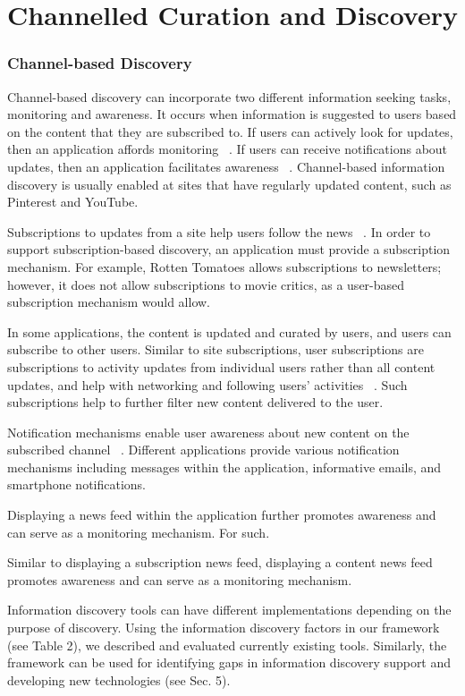 {\section{Channelled Curation and Discovery}

{\subsubsection{Channel-based Discovery}
Channel-based discovery can incorporate two different information seeking tasks, monitoring and awareness. It occurs when information is suggested to users based on the content that they are subscribed to. If users can actively look for updates, then an application affords monitoring ~\cite{morrison}. If users can receive notifications about updates, then an application facilitates awareness ~\cite{bates2002, bates1986}. Channel-based information discovery is usually enabled at sites that have regularly updated content, such as Pinterest and YouTube.                            


Subscriptions to updates from a site help users follow the news ~\cite{java}. In order to support subscription-based discovery, an application must provide a subscription mechanism. For example, Rotten Tomatoes allows subscriptions to newsletters; however, it does not allow subscriptions to movie critics, as a user-based subscription mechanism would allow. 

In some applications, the content is updated and curated by users, and users can subscribe to other users. Similar to site subscriptions, user subscriptions are subscriptions to activity updates from individual users rather than all content updates, and help with networking and following users' activities ~\cite{millen}. Such subscriptions help to further filter new content delivered to the user. 

Notification mechanisms enable user awareness about new content on the subscribed channel ~\cite{millen}. Different applications provide various notification mechanisms including messages within the application, informative emails, and smartphone notifications.

Displaying a news feed within the application further promotes awareness and can serve as a monitoring mechanism. For such. 

Similar to displaying a subscription news feed, displaying a content news feed promotes awareness and can serve as a monitoring mechanism.

Information discovery tools can have different implementations depending on the purpose of discovery. Using the information discovery factors in our framework (see Table 2), we described and evaluated currently existing tools. Similarly, the framework can be used for identifying gaps in information discovery support and developing new technologies (see Sec. 5).   \\

}}
